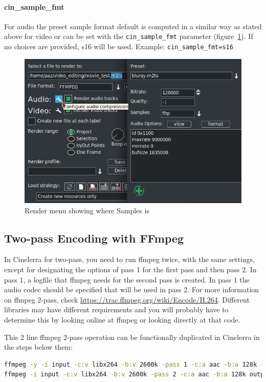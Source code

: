 \paragraph{cin\_sample\_fmt} For audio the preset sample format default is computed in a similar way as stated above for video or can be set with the \texttt{cin\_sample\_fmt} parameter (figure~\ref{fig:audio}).  If no choices are provided, s16 will be used.
Example: \texttt{cin\_sample\_fmt=s16}

\begin{figure}[htpb]
    \centering
    \includegraphics[width=0.6\linewidth]{images/audio.png}
    \caption{Render menu showing where Samples is}
    \label{fig:audio}
\end{figure}

\subsection{Two-pass Encoding with FFmpeg}%
\label{sub:two_pass_encoding_ffmpeg}

In Cinelerra for two-pass, you need to run ffmpeg twice, with the same settings, except for designating the options of pass 1 for the first pass and then pass 2.  In pass 1, a logfile that ffmpeg needs for the second pass is created.  In pass 1 the audio codec should be specified that will be used in pass 2.  For more information on ffmpeg 2-pass, check \url{https://trac.ffmpeg.org/wiki/Encode/H.264}.  Different libraries may have different requirements and you will probably have to determine this by looking online at ffmpeg or looking directly at that code.

This 2 line ffmpeg 2-pass operation can be functionally duplicated in Cinelerra in the steps below them:

\begin{lstlisting}[language=bash,numbers=none]
ffmpeg -y -i input -c:v libx264 -b:v 2600k -pass 1 -c:a aac -b:a 128k -f mp4 /dev/null && \
ffmpeg -i input -c:v libx264 -b:v 2600k -pass 2 -c:a aac -b:a 128k output.mp4
\end{lstlisting}

